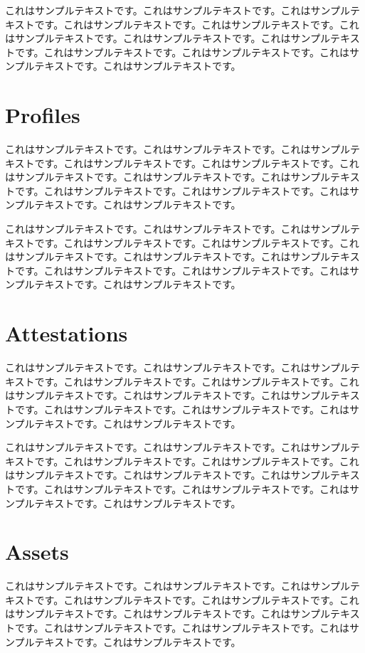 \documentclass[a4paper, dvipdfmx]{jsarticle}
\begin{document}
これはサンプルテキストです。これはサンプルテキストです。これはサンプルテキストです。これはサンプルテキストです。これはサンプルテキストです。これはサンプルテキストです。これはサンプルテキストです。これはサンプルテキストです。これはサンプルテキストです。これはサンプルテキストです。これはサンプルテキストです。これはサンプルテキストです。

\section{Profiles}
これはサンプルテキストです。これはサンプルテキストです。これはサンプルテキストです。これはサンプルテキストです。これはサンプルテキストです。これはサンプルテキストです。これはサンプルテキストです。これはサンプルテキストです。これはサンプルテキストです。これはサンプルテキストです。これはサンプルテキストです。これはサンプルテキストです。

これはサンプルテキストです。これはサンプルテキストです。これはサンプルテキストです。これはサンプルテキストです。これはサンプルテキストです。これはサンプルテキストです。これはサンプルテキストです。これはサンプルテキストです。これはサンプルテキストです。これはサンプルテキストです。これはサンプルテキストです。これはサンプルテキストです。

\section{Attestations}
これはサンプルテキストです。これはサンプルテキストです。これはサンプルテキストです。これはサンプルテキストです。これはサンプルテキストです。これはサンプルテキストです。これはサンプルテキストです。これはサンプルテキストです。これはサンプルテキストです。これはサンプルテキストです。これはサンプルテキストです。これはサンプルテキストです。

これはサンプルテキストです。これはサンプルテキストです。これはサンプルテキストです。これはサンプルテキストです。これはサンプルテキストです。これはサンプルテキストです。これはサンプルテキストです。これはサンプルテキストです。これはサンプルテキストです。これはサンプルテキストです。これはサンプルテキストです。これはサンプルテキストです。

\section{Assets}
これはサンプルテキストです。これはサンプルテキストです。これはサンプルテキストです。これはサンプルテキストです。これはサンプルテキストです。これはサンプルテキストです。これはサンプルテキストです。これはサンプルテキストです。これはサンプルテキストです。これはサンプルテキストです。これはサンプルテキストです。これはサンプルテキストです。
\end{document}
